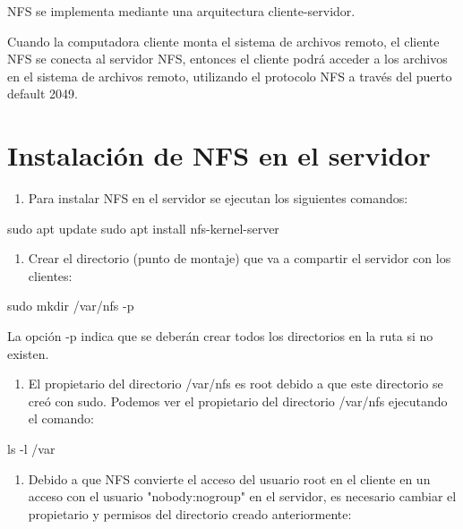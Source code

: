 NFS se implementa mediante una arquitectura cliente-servidor.

Cuando la computadora cliente monta el sistema de archivos remoto, el cliente NFS se conecta al servidor NFS, entonces el cliente podrá acceder a los archivos en el sistema de archivos remoto, utilizando el protocolo NFS a través del puerto default 2049.

\section{Instalación de NFS en el servidor}

\begin{enumerate}
\item Para instalar NFS en el servidor se ejecutan los siguientes comandos:
\end{enumerate}

\begin{SourceCode}
sudo apt update
sudo apt install nfs-kernel-server
\end{SourceCode}

\begin{enumerate}
\item Crear el directorio (punto de montaje) que va a compartir el servidor con los clientes:
\end{enumerate}

\begin{SourceCode}
sudo mkdir /var/nfs -p
\end{SourceCode}

La opción -p indica que se deberán crear todos los directorios en la ruta si no existen.

\begin{enumerate}
\item El propietario del directorio /var/nfs es root debido a que este directorio se creó con sudo. Podemos ver el propietario del directorio /var/nfs ejecutando el comando:
\end{enumerate}

\begin{SourceCode}
ls -l /var
\end{SourceCode}

\begin{enumerate}
\item Debido a que NFS convierte el acceso del usuario root en el cliente en un acceso con el usuario "nobody:nogroup" en el servidor, es necesario cambiar el propietario y permisos del directorio creado anteriormente:
\end{enumerate}

